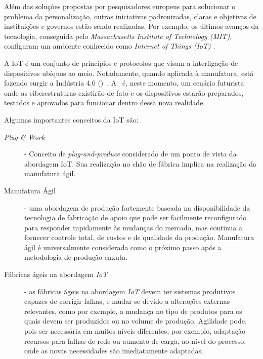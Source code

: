 Além das soluções propostas por pesquisadores europeus para solucionar o problema da personalização, outras iniciativas padronizadas, claras e objetivas de instituições e governos estão sendo realizadas. Por exemplo, os últimos avanços da tecnologia, conseguida pelo \textit{Massachusetts Institute of Technology (MIT)}, configuram um ambiente conhecido como \textit{Internet of Things (IoT)} \cite{STANKOVIC2014}.


A IoT é um conjunto de princípios e protocolos que visam a interligação de dispositivos ubíquos ao meio. Notadamente, quando aplicada à manufatura, está fazendo surgir a Indústria 4.0 (\iQuatroZero)~\cite{DRATH2014}. A \iQuatroZero \ é, neste momento, um cenário futurista onde as ciberestruturas existirão de fato e os dispositivos estarão preparados, testados e aprovados para funcionar dentro dessa nova realidade.

Algumas importantes conceitos da IoT são:


\begin{description}
	
\item[\textit{Plug \& Work}]-
Conceito de \textit{plug-and-produce} considerado de um ponto de vista da abordagem IoT. Sua realização no chão de fábrica implica na realização da manufatura ágil. 

\item[Manufatura Ágil] - uma abordagem de produção fortemente baseada na disponibilidade da tecnologia de fabricação de apoio que pode ser facilmente reconfigurado para responder rapidamente às mudanças do mercado, mas continua a fornecer controle total, de custos e de qualidade da produção. Manufatura ágil é universalmente considerada como o próximo passo após a metodologia de produção enxuta.

\item[Fábricas ágeis na abordagem \textit{IoT}] - as fábricas ágeis na abordagem \textit{IoT} devem ter sistemas produtivos capazes de corrigir falhas, e mudar-se devido a alterações externas relevantes, como por exemplo, a mudança no tipo de produtos para os quais devem ser produzidos ou no volume de produção. Agilidade pode, pois ser necessária em muitos níveis diferentes, por exemplo, adaptação recursos para falhas de rede ou aumento de carga, ao nível do processo, onde as novas necessidades são imediatamente adaptadas.

\end{description}



